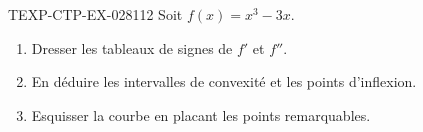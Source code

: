 \begin{exercice}{TEXP-CTP-EX-028}{1}{12}
Soit $f(x) = x^3 - 3x$.
\begin{enumerate}
  \item Dresser les tableaux de signes de $f'$ et $f''$.
  \item En déduire les intervalles de convexité et les points d'inflexion.
  \item Esquisser la courbe en placant les points remarquables.
\end{enumerate}

\end{exercice}

